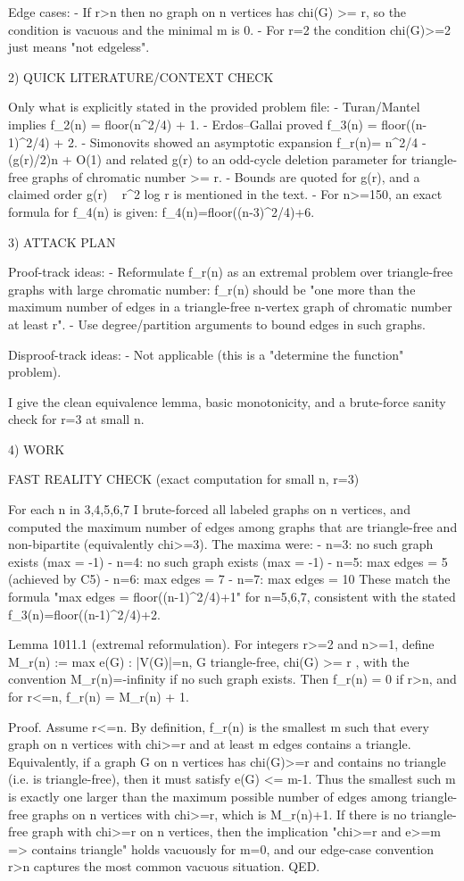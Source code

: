 Edge cases:
- If r>n then no graph on n vertices has chi(G) >= r, so the condition is vacuous and the minimal m is 0.
- For r=2 the condition chi(G)>=2 just means "not edgeless".

2) QUICK LITERATURE/CONTEXT CHECK

Only what is explicitly stated in the provided problem file:
- Turan/Mantel implies f_2(n) = floor(n^2/4) + 1.
- Erdos--Gallai proved f_3(n) = floor((n-1)^2/4) + 2.
- Simonovits showed an asymptotic expansion f_r(n)= n^2/4 - (g(r)/2)n + O(1) and related g(r) to an odd-cycle deletion parameter for triangle-free graphs of chromatic number >= r.
- Bounds are quoted for g(r), and a claimed order g(r) ~ r^2 log r is mentioned in the text.
- For n>=150, an exact formula for f_4(n) is given: f_4(n)=floor((n-3)^2/4)+6.

3) ATTACK PLAN

Proof-track ideas:
- Reformulate f_r(n) as an extremal problem over triangle-free graphs with large chromatic number: f_r(n) should be "one more than the maximum number of edges in a triangle-free n-vertex graph of chromatic number at least r".
- Use degree/partition arguments to bound edges in such graphs.

Disproof-track ideas:
- Not applicable (this is a "determine the function" problem).

I give the clean equivalence lemma, basic monotonicity, and a brute-force sanity check for r=3 at small n.

4) WORK

FAST REALITY CHECK (exact computation for small n, r=3)

For each n in {3,4,5,6,7} I brute-forced all labeled graphs on n vertices, and computed the maximum number of edges among graphs that are triangle-free and non-bipartite (equivalently chi>=3).
The maxima were:
- n=3: no such graph exists (max = -1)
- n=4: no such graph exists (max = -1)
- n=5: max edges = 5 (achieved by C5)
- n=6: max edges = 7
- n=7: max edges = 10
These match the formula "max edges = floor((n-1)^2/4)+1" for n=5,6,7, consistent with the stated f_3(n)=floor((n-1)^2/4)+2.

Lemma 1011.1 (extremal reformulation).
For integers r>=2 and n>=1, define
  M_r(n) := max{ e(G) : |V(G)|=n, G triangle-free, chi(G) >= r },
with the convention M_r(n)=-infinity if no such graph exists.
Then
  f_r(n) = 0 if r>n,
and for r<=n,
  f_r(n) = M_r(n) + 1.

Proof.
Assume r<=n. By definition, f_r(n) is the smallest m such that every graph on n vertices with chi>=r and at least m edges contains a triangle.
Equivalently, if a graph G on n vertices has chi(G)>=r and contains no triangle (i.e. is triangle-free), then it must satisfy e(G) <= m-1.
Thus the smallest such m is exactly one larger than the maximum possible number of edges among triangle-free graphs on n vertices with chi>=r, which is M_r(n)+1.
If there is no triangle-free graph with chi>=r on n vertices, then the implication "chi>=r and e>=m => contains triangle" holds vacuously for m=0, and our edge-case convention r>n captures the most common vacuous situation.
QED.

